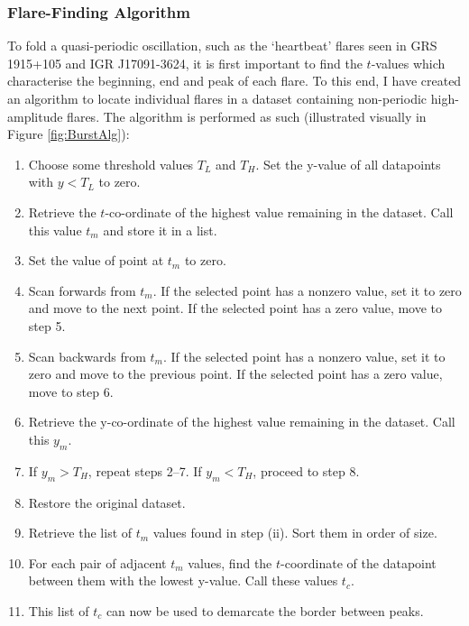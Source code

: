 \subsubsection{Flare-Finding Algorithm}
\label{sec:Flares}

\par To fold a quasi-periodic oscillation, such as the `heartbeat' flares seen in GRS 1915+105 and IGR J17091-3624, it is first important to find the $t$-values which characterise the beginning, end and peak of each flare.  To this end, I have created an algorithm to locate individual flares in a dataset containing non-periodic high-amplitude flares. The algorithm is performed as such (illustrated visually in Figure \ref{fig:BurstAlg}):

\begin{enumerate}
  \item Choose some threshold values $T_L$ and $T_H$.  Set the y-value of all datapoints with $y<T_L$ to zero.
  \item Retrieve the $t$-co-ordinate of the highest value remaining in the dataset.  Call this value $t_m$ and store it in a list.
  \item Set the value of point at $t_m$ to zero.
  \item Scan forwards from $t_m$.  If the selected point has a nonzero value, set it to zero and move to the next point.  If the selected point has a zero value, move to step 5.
  \item Scan backwards from $t_m$.  If the selected point has a nonzero value, set it to zero and move to the previous point.  If the selected point has a zero value, move to step 6.
  \item Retrieve the y-co-ordinate of the highest value remaining in the dataset.  Call this $y_m$.
  \item If $y_m>T_H$, repeat steps 2--7.  If $y_m<T_H$, proceed to step 8.
  \item Restore the original dataset.
  \item Retrieve the list of $t_m$ values found in step (ii).  Sort them in order of size.
  \item For each pair of adjacent $t_m$ values, find the $t$-coordinate of the datapoint between them with the lowest y-value.  Call these values $t_c$.
  \item This list of $t_c$ can now be used to demarcate the border between peaks.
\end{enumerate}

